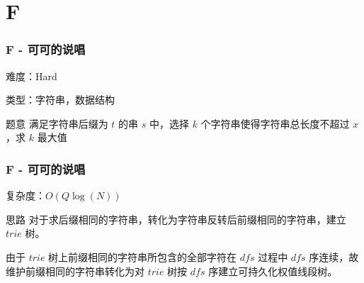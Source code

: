 \section{F}
\begin{frame}
\frametitle{F - 可可的说唱}
难度：Hard

类型：字符串，数据结构

\begin{block}{题意}
满足字符串后缀为 $t$ 的串 $s$ 中，选择 $k$ 个字符串使得字符串总长度不超过 $x$，求 $k$ 最大值
\end{block}

\end{frame}

\begin{frame}
\frametitle{F - 可可的说唱}

复杂度：$O(Q\log(N))$

\begin{block}{思路}
对于求后缀相同的字符串，转化为字符串反转后前缀相同的字符串，建立 $trie$ 树。

由于 $trie$ 树上前缀相同的字符串所包含的全部字符在 $dfs$ 过程中 $dfs$ 序连续，故维护前缀相同的字符串转化为对 $trie$ 树按 $dfs$ 序建立可持久化权值线段树。
\end{block}

\end{frame}